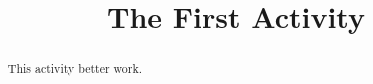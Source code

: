 \documentclass{ximera}
\title{The First Activity}
\begin{document}
\begin{abstract}
This activity better work.
\end{abstract}

\maketitle
\end{document}
